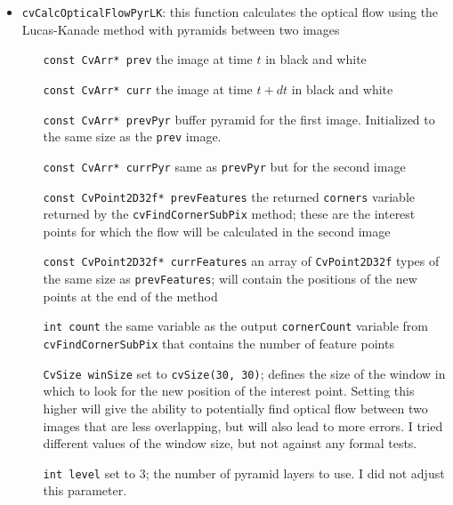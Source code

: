 \documentclass{article}
\begin{document}
\begin{itemize}
\begin{itemize}
\end{itemize} 

\item \verb|cvCalcOpticalFlowPyrLK|: this function calculates the optical flow
using the Lucas-Kanade method with pyramids between two images 

\begin{itemize}

\item[\texttt{const CvArr* prev}] the image at time $t$ in black and white 

\item[\texttt{const CvArr* curr}] the image at time $t + dt$ in black and white

\item[\texttt{const CvArr* prevPyr}] buffer pyramid for the first image.
Initialized to the same size as the \texttt{prev} image.  

\item[\texttt{const CvArr* currPyr}] same as \texttt{prevPyr} but for the
second image  

\item[\texttt{const CvPoint2D32f* prevFeatures}] the returned \texttt{corners}
variable returned by the \texttt{cvFindCornerSubPix} method; these are the
interest points for which the flow will be calculated in the second image

\item[\texttt{const CvPoint2D32f* currFeatures}] an array of
\texttt{CvPoint2D32f} types of the same size as \texttt{prevFeatures}; will
contain the positions of the new points at the end of the method 

\item[\texttt{int count}] the same variable as the output \texttt{cornerCount}
variable from \texttt{cvFindCornerSubPix} that contains the number of feature
points 

\item[\texttt{CvSize winSize}] set to \texttt{cvSize(30, 30)}; defines the size
of the window in which to look for the new position of the interest point.
Setting this higher will give the ability to potentially find optical flow
between two images that are less overlapping, but will also lead to more
errors. I tried different values of the window size, but not against any formal
tests.  

\item[\texttt{int level}] set to $3$; the number of pyramid layers to use. I
did not adjust this parameter.  


\end{itemize}
\end{itemize}
\end{document}
